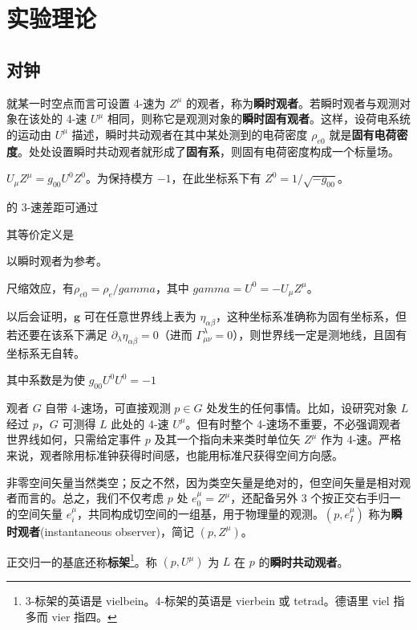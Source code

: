\chapter{实验理论}\label{chpt:experiment}

\section{对钟}
就某一时空点而言可设置 4-速为 $Z^\mu$ 的观者，称为\textbf{瞬时观者}。若瞬时观者与观测对象在该处的 4-速 $U^\mu$ 相同，则称它是观测对象的\textbf{瞬时固有观者}。这样，设荷电系统的运动由 $U^\mu$ 描述，瞬时共动观者在其中某处测到的电荷密度 $\rho_{e0}$ 就是\textbf{固有电荷密度}。处处设置瞬时共动观者就形成了\textbf{固有系}，则固有电荷密度构成一个标量场。


$U_\mu Z^\mu=g_{00} U^0 Z^0$。为保持模方 $-1$，在此坐标系下有 $Z^0=1/\sqrt{-g_{00}}$。

的 3-速差距可通过




其等价定义是
 

以瞬时观者为参考。

尺缩效应，有$\rho_{e0}=\rho_e/gamma$，其中 $gamma=U^0=-U_\mu Z^\mu$。

以后会证明，$\bm g$ 可在任意世界线上表为 $\eta_{\alpha\beta}$，这种坐标系准确称为固有坐标系，但若还要在该系下满足 $\partial_\lambda\eta_{\alpha\beta}=0$（进而 $\Gamma^\lambda_{\mu\nu}=0$），则世界线一定是测地线，且固有坐标系无自转。

其中系数是为使 $g_{00}U^0U^0=-1$

观者 $G$ 自带 4-速场，可直接观测 $p\in G$ 处发生的任何事情。比如，设研究对象 $L$ 经过 $p$，$G$ 可测得 $L$ 此处的 4-速 $U^\mu$。但有时整个 4-速场不重要，不必强调观者世界线如何，只需给定事件 $p$ 及其一个指向未来类时单位矢 $Z^\mu$ 作为 4-速。严格来说，观者除用标准钟获得时间感，也能用标准尺获得空间方向感。

非零空间矢量当然类空；反之不然，因为类空矢量是绝对的，但空间矢量是相对观者而言的。总之，我们不仅考虑 $p$ 处 $e_0^\mu=Z^\mu$，还配备另外 3 个按正交右手归一的空间矢量 $e_i^\mu$，共同构成切空间的一组基，用于物理量的观测。$(p,e_I^\mu)$ 称为\textbf{瞬时观者}(instantaneous observer)，简记 $(p,Z^\mu)$。

正交归一的基底还称\textbf{标架}\footnote{3-标架的英语是 vielbein。4-标架的英语是 vierbein 或 tetrad。德语里 viel 指多而 vier 指四。}。称 $(p,U^\mu)$ 为 $L$ 在 $p$ 的\textbf{瞬时共动观者}。



